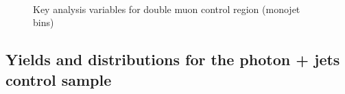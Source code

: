 \begin{figure}[!h]
\begin{center}
         \\
        \caption{Key analysis variables for double muon control region (monojet bins)}
        \label{fig:distribution_doublemu_mono}
    \end{center}
\end{figure}

\newpage
\subsection{Yields and distributions for the photon + jets control sample}

